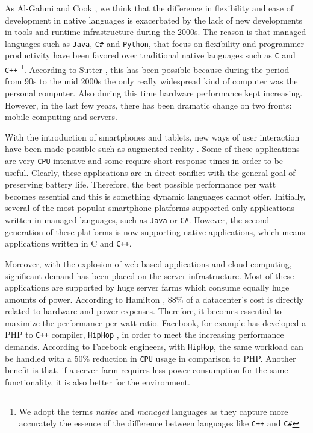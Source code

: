 As Al-Gahmi and Cook \cite{Al-Gahmi}, we think that the difference in flexibility and ease of development in native languages is
exacerbated by the lack of new developments in tools and runtime infrastructure during the 2000s. The reason is that managed
languages such as \texttt{Java}, \texttt{C\#} and \texttt{Python}, that focus on flexibility and programmer productivity
have been favored over traditional native languages such as \texttt{C} and \texttt{C++} \footnote{We adopt the terms \emph{native}
and \emph{managed} languages as they capture more accurately the essence of the difference between languages like \texttt{C++} and
\texttt{C\#}}. According to Sutter \cite{CPPAndBeyond2011}, this has been possible because during the period from 90s to the mid 2000s
the only really widespread kind of computer was the personal computer. Also during this time hardware performance kept increasing.
However, in the last few years, there has been dramatic change on two fronts: mobile computing and servers.

With the introduction of smartphones and tablets, new ways of user interaction have been made possible such as augmented reality \cite{Petter,Sulisz,Jung,Bauset,Ha}. Some of
these applications are very \texttt{CPU}-intensive and some require short response times in order to be useful. Clearly, these applications are in
direct conflict with the general goal of preserving battery life. Therefore, the best possible performance per watt becomes essential
and this is something dynamic languages cannot offer. Initially, several of the most popular smartphone platforms supported only applications
written in managed languages, such as \texttt{Java} or \texttt{C\#}. However, the second generation of these platforms is now supporting native applications,
which means applications written in C and \texttt{C++}.

Moreover, with the explosion of web-based applications and cloud computing, significant demand has been placed on the server infrastructure.
Most of these applications are supported by huge server farms which consume equally huge amounts of power. According to Hamilton \cite{Hamilton},
88\% of a datacenter's cost is directly related to hardware and power expenses. Therefore, it becomes essential to maximize the performance per watt ratio.
Facebook, for example has developed a PHP to \texttt{C++} compiler, \texttt{HipHop} \cite{HipHop}, in order to meet the increasing performance demands.
According to Facebook engineers, with \texttt{HipHop}, the same workload can be handled with a 50\% reduction in \texttt{CPU} usage in comparison to PHP.
Another benefit is that, if a server farm requires less power consumption for the same functionality, it is also better for the environment.

